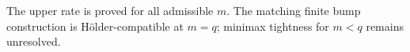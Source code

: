 The upper rate is proved for all admissible \(m\).  The matching finite bump construction is H\"older-compatible at \(m=q\); minimax tightness for \(m<q\) remains unresolved.